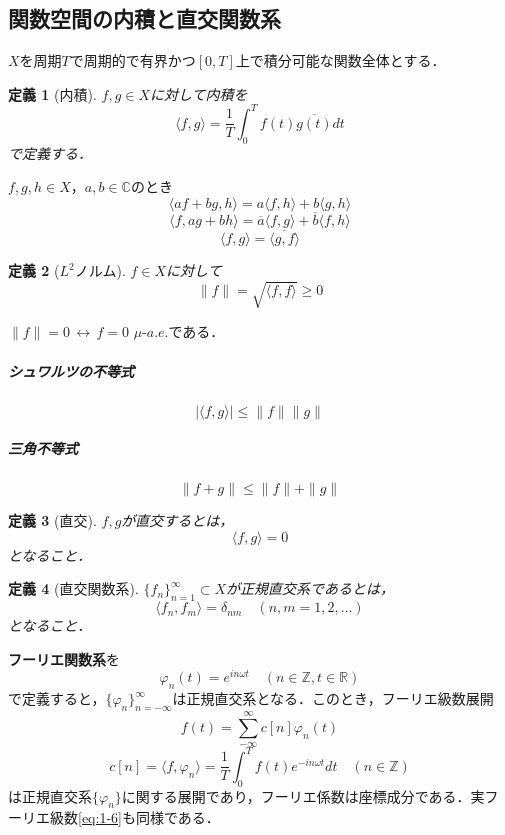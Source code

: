 \documentclass[dvipdfmx,a4j,10pt]{jsarticle}
\theoremstyle{mystyle1}
\theoremstyle{mystyle3}
\theoremstyle{mystyle4}
\theoremstyle{mystyle2}
\newtheorem{dfn*}{定義}
\begin{document}
\subsection{関数空間の内積と直交関数系}


$X$を周期$T$で周期的で有界かつ$[0,T]$上で積分可能な関数全体とする．

\begin{dfn*}[内積]
    $f,g\in X$に対して内積を
    \[
        \langle f,g \rangle=\frac{1}{T}\int_0^T f(t)\overline{g(t)}dt
    \]
    で定義する．
\end{dfn*}

$f,g,h\in X$，$a,b\in\mathbb{C}$のとき
\[
    \langle af+bg,h\rangle=a\langle f,h\rangle +b\langle g,h\rangle
\]
\[
    \langle f,ag+bh\rangle=\overline{a}\langle f,g\rangle +\overline{b}\langle f,h\rangle
\]
\[
    \langle f,g\rangle=\overline{\langle g,f\rangle}
\]

\begin{dfn*}[$L^2$ノルム]
    $f\in X$に対して
    \[
        \|f\|=\sqrt{\langle f,f\rangle}\geq 0
    \]
\end{dfn*}

$\|f\|=0\,\leftrightarrow\,f=0$ $\mu$-$a.e.$である．

\subparagraph{シュワルツの不等式}

\begin{equation}\label{eq:1-18}
    |\langle f,g\rangle|\leq\|f\|\|g\|
\end{equation}

\subparagraph{三角不等式}

\begin{equation}\label{eq:1-19}
    \|f+g\|\leq\|f\|+\|g\|
\end{equation}

\begin{dfn*}[直交]
    $f,g$が直交するとは，
    \[
        \langle f,g\rangle=0
    \]
    となること．
\end{dfn*}

\begin{dfn*}[直交関数系]
    $\{f_n\}_{n=1}^\infty \subset X$が正規直交系であるとは，
    \[
        \langle f_n,f_m\rangle=\delta_{nm}\quad(n,m=1,2,\ldots)
    \]
    となること．
\end{dfn*}

\textbf{フーリエ関数系}を
\[
    \varphi_n(t)=e^{in\omega t}\quad(n\in\mathbb{Z},t\in\mathbb{R})
\]
で定義すると，$\{\varphi_n\}_{n=-\infty}^\infty$は正規直交系となる．このとき，フーリエ級数展開
\[
    f(t)=\sum_{-\infty}^\infty c[n]\varphi_n(t)
\]
\[
    c[n]=\langle f,\varphi_n \rangle=\frac{1}{T}\int_0^T f(t)e^{-in\omega t}dt\quad(n\in\mathbb{Z})
\]
は正規直交系$\{\varphi_n\}$に関する展開であり，フーリエ係数は座標成分である．実フーリエ級数\eqref{eq:1-6}も同様である．
\end{document}
